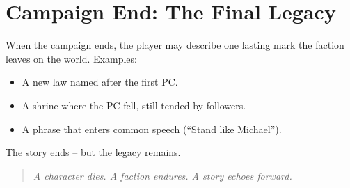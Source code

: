 \section{Campaign End: The Final Legacy}
\label{sec:final-legacy}

When the campaign ends, the player may describe one lasting mark the faction leaves on the world. Examples:
\begin{itemize}
  \item A new law named after the first PC.
  \item A shrine where the PC fell, still tended by followers.
  \item A phrase that enters common speech (``Stand like Michael'').
\end{itemize}
The story ends -- but the legacy remains.

\begin{quote}
\emph{A character dies. A faction endures. A story echoes forward.}
\end{quote}